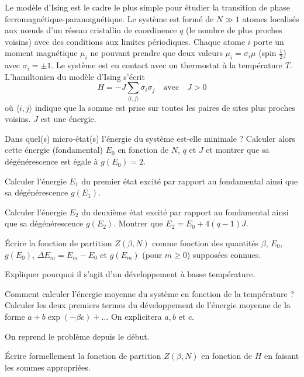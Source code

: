 Le modèle d'Ising est le cadre le plus simple pour étudier la transition de phase ferromagnétique-paramagnétique. Le système est formé de $N \gg 1$ atomes localisés aux n\oe uds d'un réseau cristallin de coordinence $q$ (le nombre de plus proches voisins) avec des conditions aux limites périodiques. Chaque atome $i$ porte un moment magnétique $\mu_i$ ne pouvant prendre que deux valeurs $\mu_i=\sigma_i \mu$ (spin $\frac{1}{2}$) avec $\sigma_i= \pm 1$. Le système est en contact avec un thermostat à la température $T$. L'hamiltonien du modèle d'Ising s'écrit
$$
H=-J\sum_{\langle i,j \rangle}\sigma_i \sigma_j  \quad \textrm{avec} \quad J>0
$$
où ${\langle i,j\rangle}$ indique que la somme est prise sur toutes les paires de sites plus proches voisins. $J$ est une énergie.



\question Dans quel(s) micro-état(s) l'énergie du système est-elle minimale ? Calculer alors cette énergie (fondamental) $E_0$ en fonction de $N$, $q$ et $J$ et montrer que sa dégénérescence est égale à $g(E_0)=2$.

\question Calculer l'énergie $E_1$ du premier état excité par rapport au fondamental ainsi que sa dégénérescence $g(E_1)$.

\question Calculer l'énergie $E_2$ du deuxième état excité par rapport au fondamental ainsi que sa dégénérescence $g(E_2)$. Montrer que $E_2=E_0+4(q-1)J$.

\question  \'Ecrire la fonction de partition $Z(\beta,N)$ comme fonction des quantités $\beta$, $E_0$, $g(E_0)$, $\Delta E_m=E_m-E_0$ et $g(E_m)$ (pour $m \ge 0$) supposées connues.

\question Expliquer pourquoi il s'agit d'un développement à basse température.

\question Comment calculer l'énergie moyenne du système en fonction de la température ? Calculer les deux premiers termes du développement de l'énergie moyenne de la forme $a+b\exp (-\beta c)+ \ldots$ On explicitera $a, b$ et $c$.




On reprend le problème depuis le début.

\question \'Ecrire formellement la fonction de partition $Z(\beta,N)$ en fonction de $H$ en faisant les sommes appropriées.

